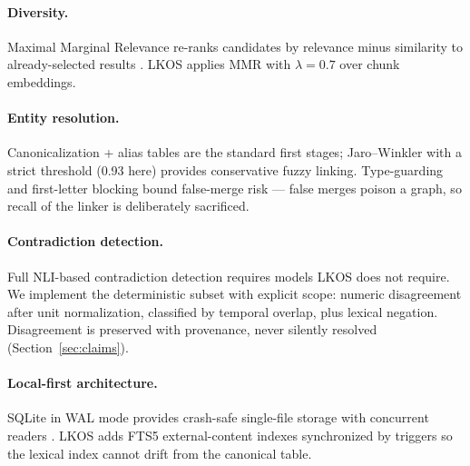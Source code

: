 \paragraph{Diversity.}
Maximal Marginal Relevance re-ranks candidates by relevance minus similarity
to already-selected results \cite{carbonell1998}. LKOS applies MMR with
$\lambda=0.7$ over chunk embeddings.

\paragraph{Entity resolution.}
Canonicalization + alias tables are the standard first stages;
Jaro--Winkler \cite{winkler1989} with a strict threshold (0.93 here) provides
conservative fuzzy linking. Type-guarding and first-letter blocking bound
false-merge risk --- false merges poison a graph, so recall of the linker is
deliberately sacrificed.

\paragraph{Contradiction detection.}
Full NLI-based contradiction detection requires models LKOS does not require.
We implement the deterministic subset with explicit scope: numeric
disagreement after unit normalization, classified by temporal overlap, plus
lexical negation. Disagreement is preserved with provenance, never silently
resolved (Section~\ref{sec:claims}).

\paragraph{Local-first architecture.}
SQLite in WAL mode provides crash-safe single-file storage with concurrent
readers \cite{kleppmann2017}. LKOS adds FTS5 external-content indexes
synchronized by triggers so the lexical index cannot drift from the canonical
table.
